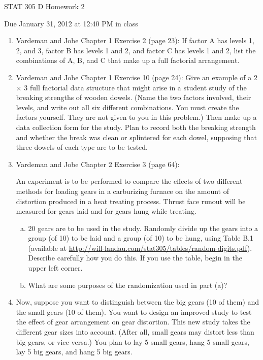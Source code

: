 \documentclass{article}\usepackage{graphicx, color}
\numberwithin{equation}{section}
\begin{document}
\begin{flushleft}


\begin{center} \LARGE
STAT 305 D Homework 2 
\end{center}
\begin{center} \Large
Due January 31, 2012 at 12:40 PM in class
\end{center}


\begin{enumerate}[1. ]
\item Vardeman and Jobe Chapter 1 Exercise 2 (page 23): If factor A has levels 1, 2, and 3, factor B has levels 1 and 2, and factor C has levels 1 and 2, list the combinations of A, B, and C that make up a full factorial arrangement.
\item Vardeman and Jobe Chapter 1 Exercise 10 (page 24): Give an example of a 2 $\times$ 3 full factorial data structure that might arise in a student study of the breaking strengths of wooden dowels. (Name the two factors involved, their levels, and write out all six different combinations. You must create the factors yourself. They are not given to you in this problem.) Then make up a data collection form for the study. Plan to record both the breaking strength and whether the break was clean or splintered for each dowel, supposing that three dowels of each type are to be tested.

\item  Vardeman and Jobe Chapter 2 Exercise 3 (page 64): 

An experiment is to be performed to compare the effects of two different methods for loading gears in a carburizing furnace on the amount of distortion produced in a heat treating process. Thrust face runout will be measured for gears laid and for gears hung while treating.

\begin{enumerate}[a. ]
\item 20 gears are to be used in the study. Randomly divide up the gears into a group (of 10) to be laid and a group (of 10) to be hung, using Table B.1 (available at \href{http://will-landau.com/stat305/tables/random-digits.pdf}{http://will-landau.com/stat305/tables/random-digits.pdf}). Describe carefully how you do this. If you use the table, begin in the upper left corner.
\item What are some purposes of the randomization used in part (a)?
\end{enumerate}


\item Now, suppose you want to distinguish between the big gears (10 of them) and the small gears (10 of them). You want to design an improved study to test the effect of gear arrangement on gear distortion. This new study takes the different gear sizes into account. (After all, small gears may distort less than big gears, or vice versa.) You plan to lay 5 small gears, hang 5 small gears, lay 5 big gears, and hang 5 big gears.


\end{enumerate}
\end{flushleft}
\end{document}
